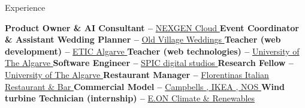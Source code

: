 \begin{rubric}{Experience}

  \entry*[\texttt{2022 –- ...~~~~~~~~}]
  \textbf{Product Owner \& AI Consultant --}{
    \href{https://www.nexgencloud.co.uk/}{
      NEXGEN Cloud
      \color{MarkerColour!80!black}\faLink}}
  \entry*[\texttt{2013 –- ...~~~~~~~~}]
  \textbf{Event Coordinator \& Assistant Wedding Planner --}{
    \href{https://oldvillageweddings.com/}{
      Old Village Weddings
      \color{MarkerColour!80!black}\faLink}}
  \entry*[\texttt{2022 –- 2022~~~~~~~}]
  \textbf{Teacher (web development) --}{
    \href{https://eticalgarve.com/en/curso/programacao-web-e-mobile-2/}{
      ETIC Algarve
      \color{MarkerColour!80!black}\faLink}}
  \entry*[\texttt{2021 –- 2022~~~~~~~}]
  \textbf{Teacher (web technologies) --}{
    \href{https://www.ualg.pt/}{
      University of The Algarve
      \color{MarkerColour!80!black}\faLink}}
  \entry*[\texttt{2019 –- 2022~~~~~~~}]
  \textbf{Software Engineer --}{
    \href{https://spic.pt/}{
      SPIC digital studios
      \color{MarkerColour!80!black}\faLink}}
  \entry*[\texttt{2018 –- 2021~~~~~~~}]
  \textbf{Research Fellow --}{
    \href{https://www.ualg.pt/}{
      University of The Algarve %
      \color{MarkerColour!80!black}\faLink}}
  \entry*[\texttt{2015 –- 2020~~~~~~~}]
  \textbf{Restaurant Manager --}{
    \href{https://www.facebook.com/florentinasbarvilamoura/}{
      Florentina\textquotesingle s Italian Restaurant \& Bar
      \color{MarkerColour!80!black}\faLink}}
  \entry*[\texttt{2015 –- 2019~~~~~~~}]
  \textbf{Commercial Model --}{
    \href{http://www.youtube.com/watch?v=emYXhDXjB2g&t=0m18s}{
      Campbell\textquotesingle s
      \color{MarkerColour!80!black}\faLink}
    \href{http://www.youtube.com/watch?v=SI6vUZZCXb8&t=0m21s}{
      , IKEA
      \color{MarkerColour!80!black}\faLink}
    \href{http://www.youtube.com/watch?v=vh04frxkgcU&t=0m34s}{
      , NOS
      \color{MarkerColour!80!black}\faLink}}
  \entry*[\texttt{2015 –- 2015~~~~~~~}]
  \textbf{Wind turbine Technician (internship) --}{
    \href{https://www.eon.com/}{
      E.ON Climate \& Renewables
      \color{MarkerColour!80!black}\faLink}}


\end{rubric}